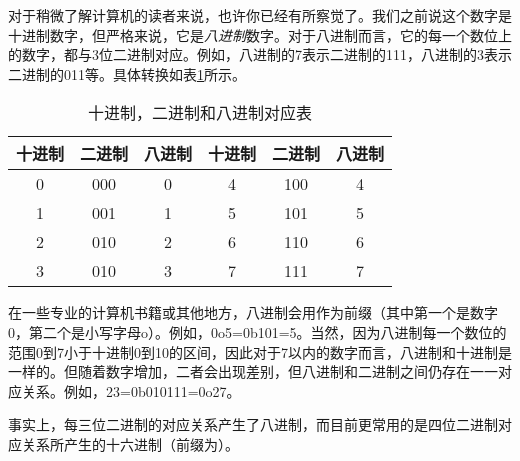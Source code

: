 \begin{extend}
    对于稍微了解计算机的读者来说，也许你已经有所察觉了。我们之前说这个数字是十进制数字，但严格来说，它是\emph{八进制}数字。对于八进制而言，它的每一个数位上的数字，都与3位二进制对应。例如，八进制的7表示二进制的111，八进制的3表示二进制的011等。具体转换如表\ref{tab:文件权限管理-十进制，二进制和八进制对应表}所示。

    \begin{table}[h]
        \centering
        \begin{tabular}{c|c|c||c|c|c}
            \hline
            \multicolumn{1}{c}{\textbf{十进制}} & \multicolumn{1}{c}{\textbf{二进制}} & \multicolumn{1}{c}{\textbf{八进制}} & \multicolumn{1}{c}{\textbf{十进制}} & \multicolumn{1}{c}{\textbf{二进制}} & \multicolumn{1}{c}{\textbf{八进制}}\\
            \hline
            0 & 000 & 0 & 4 & 100 & 4\\
            1 & 001 & 1 & 5 & 101 & 5\\
            2 & 010 & 2 & 6 & 110 & 6\\
            3 & 010 & 3 & 7 & 111 & 7\\
            \hline
        \end{tabular}
        \caption{十进制，二进制和八进制对应表}
        \label{tab:文件权限管理-十进制，二进制和八进制对应表}
    \end{table}

    在一些专业的计算机书籍或其他地方，八进制会用作为前缀（其中第一个是数字0，第二个是小写字母o）。例如，0o5=0b101=5。当然，因为八进制每一个数位的范围0到7小于十进制0到10的区间，因此对于7以内的数字而言，八进制和十进制是一样的。但随着数字增加，二者会出现差别，但八进制和二进制之间仍存在一一对应关系。例如，23=0b010111=0o27。

    事实上，每三位二进制的对应关系产生了八进制，而目前更常用的是四位二进制对应关系所产生的十六进制（前缀为）。
\end{extend}